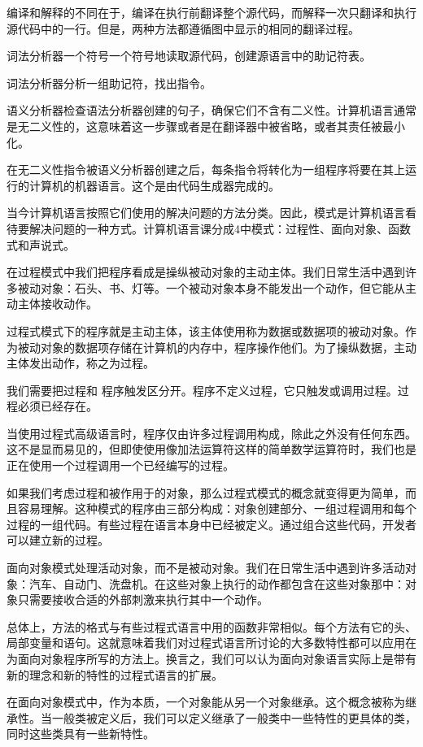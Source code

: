 编译和解释的不同在于，编译在执行前翻译整个源代码，而解释一次只翻译和执行源代码中的一行。但是，两种方法都遵循图中显示的相同的翻译过程。

词法分析器一个符号一个符号地读取源代码，创建源语言中的助记符表。

词法分析器分析一组助记符，找出指令。

语义分析器检查语法分析器创建的句子，确保它们不含有二义性。计算机语言通常是无二义性的，这意味着这一步骤或者是在翻译器中被省略，或者其责任被最小化。

在无二义性指令被语义分析器创建之后，每条指令将转化为一组程序将要在其上运行的计算机的机器语言。这个是由代码生成器完成的。

当今计算机语言按照它们使用的解决问题的方法分类。因此，模式是计算机语言看待要解决问题的一种方式。计算机语言课分成4中模式：过程性、面向对象、函数式和声说式。

在过程模式中我们把程序看成是操纵被动对象的主动主体。我们日常生活中遇到许多被动对象：石头、书、灯等。一个被动对象本身不能发出一个动作，但它能从主动主体接收动作。

过程式模式下的程序就是主动主体，该主体使用称为数据或数据项的被动对象。作为被动对象的数据项存储在计算机的内存中，程序操作他们。为了操纵数据，主动主体发出动作，称之为过程。

我们需要把过程和 程序触发区分开。程序不定义过程，它只触发或调用过程。过程必须已经存在。

当使用过程式高级语言时，程序仅由许多过程调用构成，除此之外没有任何东西。这不是显而易见的，但即使使用像加法运算符这样的简单数学运算符时，我们也是正在使用一个过程调用一个已经编写的过程。

如果我们考虑过程和被作用于的对象，那么过程式模式的概念就变得更为简单，而且容易理解。这种模式的程序由三部分构成：对象创建部分、一组过程调用和每个过程的一组代码。有些过程在语言本身中已经被定义。通过组合这些代码，开发者可以建立新的过程。

面向对象模式处理活动对象，而不是被动对象。我们在日常生活中遇到许多活动对象：汽车、自动门、洗盘机。在这些对象上执行的动作都包含在这些对象那中：对象只需要接收合适的外部刺激来执行其中一个动作。

总体上，方法的格式与有些过程式语言中用的函数非常相似。每个方法有它的头、局部变量和语句。这就意味着我们对过程式语言所讨论的大多数特性都可以应用在为面向对象程序所写的方法上。换言之，我们可以认为面向对象语言实际上是带有新的理念和新的特性的过程式语言的扩展。

在面向对象模式中，作为本质，一个对象能从另一个对象继承。这个概念被称为继承性。当一般类被定义后，我们可以定义继承了一般类中一些特性的更具体的类，同时这些类具有一些新特性。

